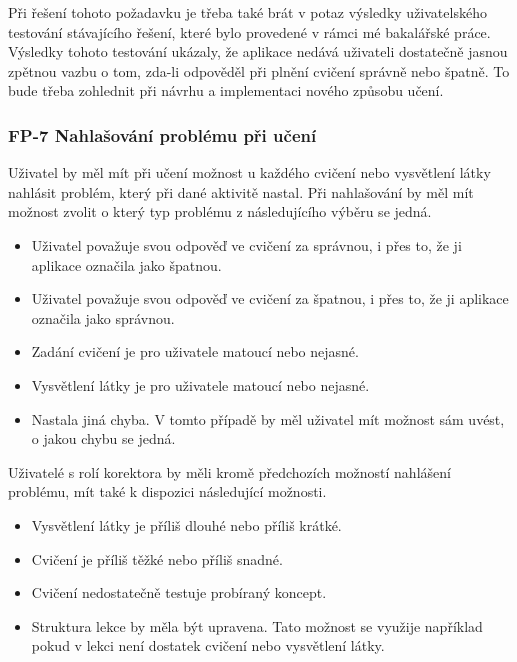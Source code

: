 Při řešení tohoto požadavku je třeba také brát v potaz výsledky uživatelského testování stávajícího řešení, které bylo provedené v rámci mé bakalářské práce. Výsledky tohoto testování ukázaly, že aplikace nedává uživateli dostatečně jasnou zpětnou vazbu o tom, zda-li odpověděl při plnění cvičení správně nebo špatně. To bude třeba zohlednit při návrhu a implementaci nového způsobu učení.

\subsubsection{FP-7 Nahlašování problému při učení}

Uživatel by měl mít při učení možnost u každého cvičení nebo vysvětlení látky nahlásit problém, který při dané aktivitě nastal. Při nahlašování by měl mít možnost zvolit o který typ problému z následujícího výběru se jedná.

\begin{itemize}
    \item Uživatel považuje svou odpověď ve cvičení za správnou, i přes to, že ji aplikace označila jako špatnou.
    \item Uživatel považuje svou odpověď ve cvičení za špatnou, i přes to, že ji aplikace označila jako správnou.
    \item Zadání cvičení je pro uživatele matoucí nebo nejasné.
    \item Vysvětlení látky je pro uživatele matoucí nebo nejasné.
    \item Nastala jiná chyba. V tomto případě by měl uživatel mít možnost sám uvést, o jakou chybu se jedná.
\end{itemize}

Uživatelé s rolí korektora by měli kromě předchozích možností nahlášení problému, mít také k dispozici následující možnosti.

\begin{itemize}
    \item Vysvětlení látky je příliš dlouhé nebo příliš krátké.
    \item Cvičení je příliš těžké nebo příliš snadné.
    \item Cvičení nedostatečně testuje probíraný koncept.
    \item Struktura lekce by měla být upravena. Tato možnost se využije například pokud v lekci není dostatek cvičení nebo vysvětlení látky.
\end{itemize}

